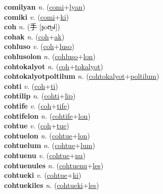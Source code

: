 \textbf{comilyan} \textit{n.} (\hyperref[comi]{comi}+\hyperref[lyan]{lyan})
 \label{comilyan} \\
\textbf{comiki} \textit{v.} (\hyperref[comi]{comi}+\hyperref[ki]{ki})
 \label{comiki} \\
\textbf{coh} \textit{n.} ({\chinese{}手} [ʂoʊ̯˧˩˧])
 \label{coh} \\
\textbf{cohak} \textit{n.} (\hyperref[coh]{coh}+\hyperref[ak]{ak})
 \label{cohak} \\
\textbf{cohluso} \textit{v.} (\hyperref[coh]{coh}+\hyperref[luso]{luso})
 \label{cohluso} \\
\textbf{cohlusolon} \textit{n.} (\hyperref[cohluso]{cohluso}+\hyperref[lon]{lon})
 \label{cohlusolon} \\
\textbf{cohtokalyot} \textit{n.} (\hyperref[coh]{coh}+\hyperref[tokalyot]{tokalyot})
 \label{cohtokalyot} \\
\textbf{cohtokalyotpoltilum} \textit{n.} (\hyperref[cohtokalyot]{cohtokalyot}+\hyperref[poltilum]{poltilum})
 \label{cohtokalyotpoltilum} \\
\textbf{cohti} \textit{v.} (\hyperref[coh]{coh}+\hyperref[ti]{ti})
 \label{cohti} \\
\textbf{cohtilip} \textit{n.} (\hyperref[cohti]{cohti}+\hyperref[lip]{lip})
 \label{cohtilip} \\
\textbf{cohtife} \textit{v.} (\hyperref[coh]{coh}+\hyperref[tife]{tife})
 \label{cohtife} \\
\textbf{cohtifelon} \textit{n.} (\hyperref[cohtife]{cohtife}+\hyperref[lon]{lon})
 \label{cohtifelon} \\
\textbf{cohtue} \textit{v.} (\hyperref[coh]{coh}+\hyperref[tue]{tue})
 \label{cohtue} \\
\textbf{cohtuelon} \textit{n.} (\hyperref[cohtue]{cohtue}+\hyperref[lon]{lon})
 \label{cohtuelon} \\
\textbf{cohtuelum} \textit{n.} (\hyperref[cohtue]{cohtue}+\hyperref[lum]{lum})
 \label{cohtuelum} \\
\textbf{cohtuenu} \textit{v.} (\hyperref[cohtue]{cohtue}+\hyperref[nu]{nu})
 \label{cohtuenu} \\
\textbf{cohtuenules} \textit{n.} (\hyperref[cohtuenu]{cohtuenu}+\hyperref[les]{les})
 \label{cohtuenules} \\
\textbf{cohtueki} \textit{v.} (\hyperref[cohtue]{cohtue}+\hyperref[ki]{ki})
 \label{cohtueki} \\
\textbf{cohtuekiles} \textit{n.} (\hyperref[cohtueki]{cohtueki}+\hyperref[les]{les})
 \label{cohtuekiles} \\
